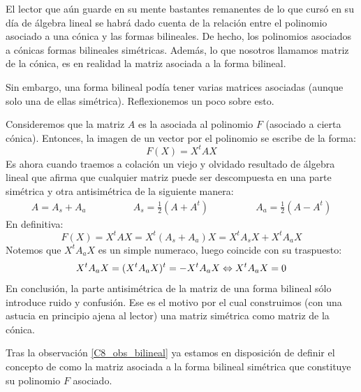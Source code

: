 \begin{obs}
	\label{C8_obs_bilineal}
	El lector que aún guarde en su mente bastantes remanentes de lo que cursó en su día de álgebra lineal se habrá dado cuenta de la relación entre el polinomio asociado a una cónica y las formas bilineales. De hecho, los polinomios asociados a cónicas  formas bilineales simétricas. Además, lo que nosotros llamamos matriz de la cónica, es en realidad la matriz asociada a la forma bilineal.
	
	Sin embargo, una forma bilineal podía tener varias matrices asociadas (aunque solo una de ellas simétrica). Reflexionemos un poco sobre esto.
	
	Consideremos que la matriz $A$ es la asociada al polinomio $F$ (asociado a cierta cónica). Entonces, la imagen de un vector por el polinomio se escribe de la forma:
	\[F(X)=X^tAX\]
	Es ahora cuando traemos a colación un viejo y olvidado resultado de álgebra lineal que afirma que cualquier matriz puede ser descompuesta en una parte simétrica y otra antisimétrica de la siguiente manera:
	\[\begin{array}{ccc}
	A=A_s+A_a\qquad &\qquad A_s=\frac{1}{2}(A+A^t)\qquad &\qquad A_a=\frac{1}{2}(A-A^t)
	\end{array}\]
	En definitiva:
	\[F(X)=X^tAX=X^t(A_s+A_a)X=X^tA_sX+X^tA_aX\]
	Notemos que $X^tA_aX$ es un simple numeraco, luego coincide con su traspuesto:
	\[X^tA_aX=(X^tA_aX)^t=-X^tA_aX\Leftrightarrow X^tA_aX=0\]
	En conclusión, la parte antisimétrica de la matriz de una forma bilineal sólo introduce ruido y confusión. Ese es el motivo por el cual construimos (con una astucia en principio ajena al lector) una matriz simétrica como matriz de la cónica.
\end{obs}
Tras la observación \ref{C8_obs_bilineal} ya estamos en disposición de definir el concepto de  como la matriz asociada a la forma bilineal simétrica que constituye su polinomio $F$ asociado.

